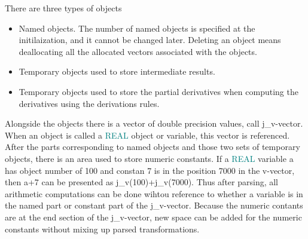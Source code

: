 There are three types of objects 
\begin{itemize} 
\item Named objects. The number of named objects is specified at the initilaization, 
and it cannot be changed later. Deleting an object means deallocating all the allocated 
vectors associated with the objects. 
\item Temporary objects used to store intermediate results. 
\item Temporary objects used to store the partial derivatives when computing the derivatives using 
the derivations rules. 
\end{itemize} 
 
Alongside the objects there is a vector of double precision values, call j\_v-vector. When an object is called a \textcolor{teal}{REAL} 
object or variable, this vector is referenced. After the parts corresponding to named objects and 
those two sets of temporary objects, there is an area used to store numeric constants. If a \textcolor{teal}{REAL} 
variable a has object number of 100 and constan 7 is in the  position 7000 in the v-vector, 
then a+7 can be presented as j\_v(100)+j\_v(7000). Thus after parsing, all arithmetic computations can be done wihtou reference to whether 
a variable is in the named part or constant part of the j\_v-vector. 
Because the numeric contants are at the end section of the j\_v-vector, 
new space can be added for the numeric 
constants without mixing up parsed transformations. 
